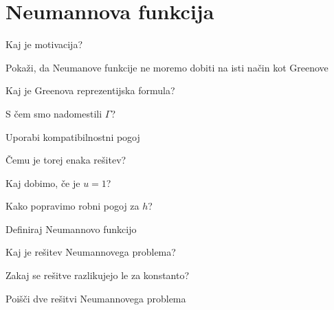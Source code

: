 \documentclass{article}
\begin{document}
    \section{Neumannova funkcija}
    \begin{enumerate}
        \item Kaj je motivacija?
        \item Pokaži, da Neumanove funkcije ne moremo dobiti na isti način kot Greenove
        \begin{itemize}
            \item Kaj je Greenova reprezentijska formula?
            \item S čem smo nadomestili $\Gamma$?
            {\color{red}\item Uporabi kompatibilnostni pogoj}
            {\color{red}\item Čemu je torej enaka rešitev?}
            {\color{red}\item Kaj dobimo, če je $u = 1$?}
        \end{itemize}
        {\color{red}\item Kako popravimo robni pogoj za $h$?}
        \item Definiraj Neumannovo funkcijo
        {\color{red}\item Kaj je rešitev Neumannovega problema?}
        \item Zakaj se rešitve razlikujejo le za konstanto?
        \item Poišči dve rešitvi Neumannovega problema
    \end{enumerate}
\end{document}
